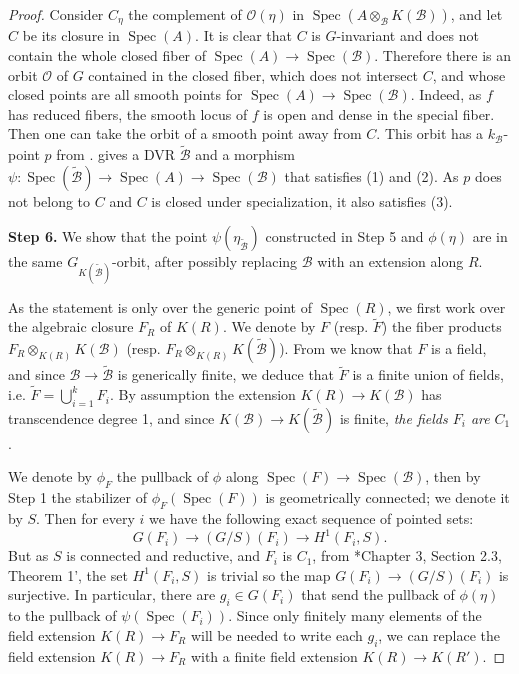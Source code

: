 \documentclass{amsart}
\newcommand{\cB}{\mathcal{B}}
\newcommand{\cO}{\mathcal{O}}
\newcommand{\qB}{R}
\newcommand{\qR}{\cB}
\newcommand{\spec}{\operatorname{Spec}}
\theoremstyle{definition}
\begin{document}
\begin{proof}
Consider $C_\eta$ the complement of $\cO(\eta)$ in $\spec(A\otimes_\qR K(\qR))$, and let $C$ be its closure in $\spec(A)$. It is clear that $C$ is $G$-invariant and does not contain the whole closed fiber of $\spec(A)\to \spec(\qR)$. Therefore there is an orbit $\cO$ of $G$ contained in the closed fiber, which does not intersect $C$, and whose closed points are all smooth points for $\spec(A)\to \spec(\qR)$. Indeed, as $f$ has reduced fibers, the smooth locus of $f$ is open and dense in the special fiber. Then one can take the orbit of a smooth point away from $C$. This orbit has a $k_\qR$-point $p$ from .  gives a DVR $\widetilde{\qR}$ and a morphism $\psi:\spec(\widetilde{\qR})\to \spec(A)\to \spec(\qR)$ that satisfies (1) and (2). As $p$ does not belong to $C$ and $C$ is closed under specialization, it also satisfies (3).

\textbf{Step 6.} We show that the point $\psi(\eta_{\widetilde{\qR}})$ constructed in Step 5 and $\phi(\eta)$ are in the same $G_{K(\widetilde{\qR})}$-orbit, after possibly replacing $\qR$ with an extension along $\qB$.

As the statement is only over the generic point of $\spec(\qB)$, we first work over the algebraic closure $F_\qB$ of $K(\qB)$. We denote by $F$ (resp. $\widetilde{F}$) the fiber products $F_\qB\otimes_{K(\qB)}K(\qR)$ (resp. $F_\qB\otimes_{K(\qB)} K(\widetilde{\qR})$).
From  we know that $F$ is a field, and since $\qR\to \widetilde{\qR}$ is generically finite, we deduce that $\widetilde{F}$ is a finite union of fields, i.e. $\widetilde{F} = \bigcup_{i=1}^kF_i$.
By assumption the extension $K(\qB)\to K(\qR)$ has transcendence degree 1, and since $K(\qR)\to K(\widetilde{\qR})$ is finite, \textit{the fields $F_i$ are }$C_1$.

We denote by $\phi_F$ the pullback of $\phi$ along $\spec(F)\to \spec(\qR)$, then by Step 1 the stabilizer of $\phi_F(\spec(F))$ is geometrically connected; we denote it by $S$. Then for every $i$ we have the following exact sequence of pointed sets: 
$$ G(F_i)\to (G/S)(F_i)\to H^1(F_i, S).$$
But as $S$ is connected and reductive, and $F_i$ is $C_1$, from \cite{Galois_cohom}*{Chapter 3, Section 2.3, Theorem 1'}, the set $ H^1(F_i, S)$ is trivial so the map $G(F_i)\to (G/S)(F_i)$ is surjective. In particular, there are $g_i\in G(F_i)$ that send the pullback of $\phi(\eta)$ to the pullback of $\psi(\spec(F_i))$.
Since only finitely many elements of the field extension $K(\qB)\to F_\qB$ will be needed to write each $g_i$, we can replace the field extension $K(\qB)\to F_\qB$ with a finite field extension $K(\qB)\to K(\qB')$.


\end{proof}
\end{document}
